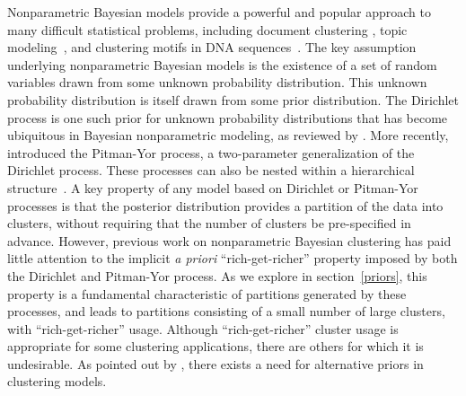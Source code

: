 \documentclass[twoside]{article}
\begin{document}
Nonparametric Bayesian models provide a powerful and popular approach
to many difficult statistical problems, including document clustering
\cite[]{ZhaGhaYan05}, topic modeling~\cite[]{teh06hierarchical}, and
clustering motifs in DNA sequences~\cite[]{JenLiu08}. The key
assumption underlying nonparametric Bayesian models is the existence
of a set of random variables drawn from some unknown probability
distribution. This unknown probability distribution is itself drawn
from some prior distribution. The Dirichlet process is one such prior
for unknown probability distributions that has become ubiquitous in
Bayesian nonparametric modeling, as reviewed by \cite{MulQui04}. More
recently, \cite{PitYor97} introduced the Pitman-Yor process, a
two-parameter generalization of the Dirichlet process. These processes
can also be nested within a hierarchical
structure~\cite[]{TehJorBea06,Teh06}. A key property of any model
based on Dirichlet or Pitman-Yor processes is that the posterior
distribution provides a partition of the data into clusters, without
requiring that the number of clusters be pre-specified in advance.
However, previous work on nonparametric Bayesian clustering has paid
little attention to the implicit \emph{a priori} ``rich-get-richer''
property imposed by both the Dirichlet and Pitman-Yor process. As we
explore in section~\ref{priors}, this property is a fundamental
characteristic of partitions generated by these processes, and leads
to partitions consisting of a small number of large clusters, with
``rich-get-richer'' usage. Although ``rich-get-richer'' cluster usage
is appropriate for some clustering applications, there are others for
which it is undesirable. As pointed out by \cite{Wel06}, there exists
a need for alternative priors in clustering models.
\end{document}
